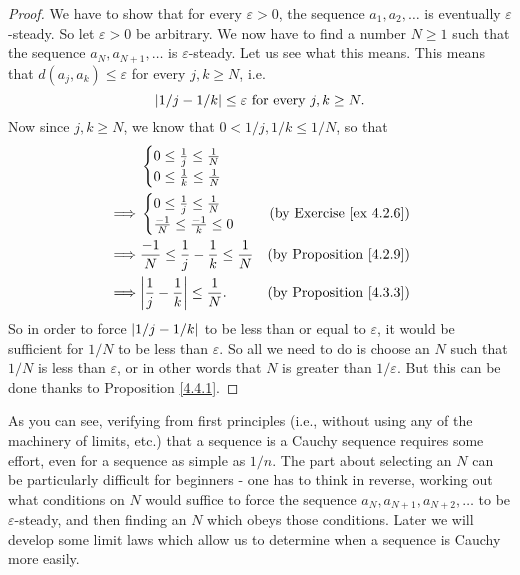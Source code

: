 \begin{proof}
We have to show that for every \(\varepsilon > 0\), the sequence \(a_1, a_2, \dots\) is eventually \(\varepsilon\)-steady.
So let \(\varepsilon > 0\) be arbitrary.
We now have to find a number \(N \geq 1\) such that the sequence \(a_N, a_{N + 1}, \dots\) is \(\varepsilon\)-steady.
Let us see what this means.
This means that \(d(a_j, a_k) \leq \varepsilon\) for every \(j, k \geq N\), i.e.
\[
    \abs*{1 / j - 1 / k} \leq \varepsilon \text{ for every } j, k \geq N.
\]
Now since \(j, k \geq N\), we know that \(0 < 1 / j, 1 / k \leq 1 / N\), so that
\begin{align*}
&
\begin{cases}
    0 \leq \frac{1}{j} \leq \frac{1}{N} \\
    0 \leq \frac{1}{k} \leq \frac{1}{N} \\
\end{cases}
\\
\implies &
\begin{cases}
    0 \leq \frac{1}{j} \leq \frac{1}{N} \\
    \frac{-1}{N} \leq \frac{-1}{k} \leq 0 \\
\end{cases}
& \text{(by Exercise \ref{ex 4.2.6})} \\
\implies & \frac{-1}{N} \leq \frac{1}{j} - \frac{1}{k} \leq \frac{1}{N} & \text{(by Proposition \ref{4.2.9})} \\
\implies & \abs*{\frac{1}{j} - \frac{1}{k}} \leq \frac{1}{N}. & \text{(by Proposition \ref{4.3.3})} \\
\end{align*}
So in order to force \(\abs*{1 / j - 1 / k}\) to be less than or equal to \(\varepsilon\), it would be sufficient for \(1 / N\) to be less than \(\varepsilon\).
So all we need to do is choose an \(N\) such that \(1 / N\) is less than \(\varepsilon\), or in other words that \(N\) is greater than \(1 / \varepsilon\).
But this can be done thanks to Proposition \ref{4.4.1}.
\end{proof}

\begin{note}
As you can see, verifying from first principles (i.e., without using any of the machinery of limits, etc.) that a sequence is a Cauchy sequence requires some effort, even for a sequence as simple as \(1 / n\).
The part about selecting an \(N\) can be particularly difficult for beginners
- one has to think in reverse, working out what conditions on \(N\) would suffice to force the sequence \(a_N, a_{N + 1}, a_{N + 2}, \dots\) to be \(\varepsilon\)-steady, and then finding an \(N\) which obeys those conditions.
Later we will develop some limit laws which allow us to determine when a sequence is Cauchy more easily.
\end{note}

